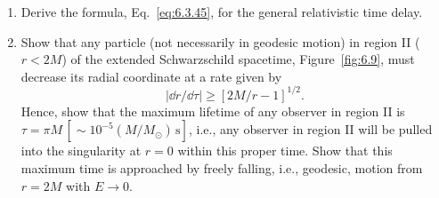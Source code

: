 \begin{enumerate}[label=\arabic*., leftmargin=*, itemsep=1.1em]
\item Derive the formula, Eq.~\eqref{eq:6.3.45}, for the general relativistic time
  delay.

\item Show that any particle (not necessarily in geodesic motion) in region II
  (\(r<2M\)) of the extended Schwarzschild spacetime, Figure~\ref{fig:6.9}, must
  decrease its radial coordinate at a rate given by
  \[
    \left|\dd r/\dd\tau\right|\geq[2M/r-1]^{1/2}.
  \]
  Hence, show that the maximum lifetime of any observer in region II is
  \(\tau=\pi M\,[\sim10^{-5}(M/M_\odot)\,\mathrm{s}]\), i.e., any observer in
  region II will be pulled into the singularity at \(r=0\) within this proper
  time. Show that this maximum time is approached by freely falling, i.e.,
  geodesic, motion from \(r=2M\) with \(E\to0\).
\end{enumerate}
